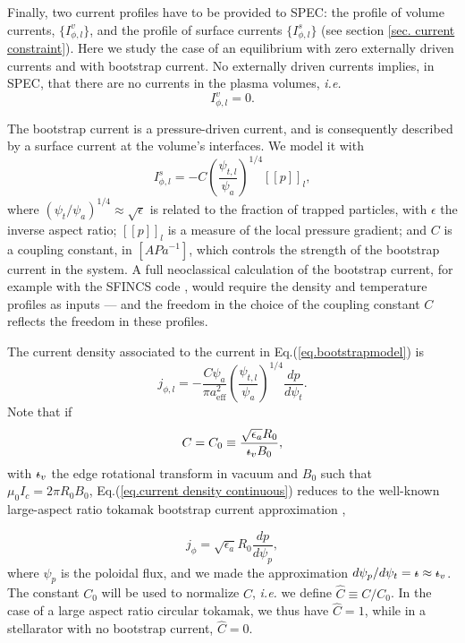 \documentclass[my_thesis.tex]{subfiles}
\begin{document}
Finally, two current profiles have to be provided to SPEC: the profile of volume currents, $\{I^v_{\phi,l}\}$, and the profile of surface currents $\{I^s_{\phi,l}\}$ (see section \ref{sec. current constraint}). Here we study the case of an equilibrium with zero externally driven currents and with bootstrap current. No externally driven currents implies, in SPEC, that there are no currents in the plasma volumes, \textit{i.e.}
\begin{equation}
	I^v_{\phi,l} = 0.\label{eq.volume current}
\end{equation}
	
The bootstrap current is a pressure-driven current, and is consequently described by a surface current at the volume's interfaces. We model it with
\begin{equation}
	I^s_{\phi,l} = -C \left(\frac{\psi_{t,l}}{\psi_a}\right)^{1/4} \left[\left[p\right]\right]_l, \label{eq.bootstrapmodel}
\end{equation}
where $(\psi_t / \psi_a)^{1/4}\approx\sqrt{\epsilon}$ is related to the fraction of trapped particles, with $\epsilon$ the inverse aspect ratio; $[[p]]_l$ is a measure of the local pressure gradient; and $C$ is a coupling constant, in $[APa^{-1}]$, which controls the strength of the bootstrap current in the system. 
A full neoclassical calculation of the bootstrap current, for example with the SFINCS code \citep{landremanComparisonParticleTrajectories2014}, would require the density and temperature profiles as inputs --- and the freedom in the choice of the coupling constant $C$ reflects the freedom in these profiles. 

	

The current density associated to the current in Eq.(\ref{eq.bootstrapmodel}) is
\begin{equation}
	j_{\phi,l} = -\frac{C\psi_a}{\pi a_{\text{eff}}^2}\left(\frac{\psi_{t,l}}{\psi_a}\right)^{1/4}\frac{dp}{d\psi_t}. \label{eq.current density continuous}
\end{equation}	
Note that if 
\begin{equation}
	C = C_0 \equiv \frac{\sqrt{\epsilon_a}R_0}{\text{$\iota\!\!$-}_v B_0}, \label{eq. def C0}
\end{equation}
with $\text{$\iota\!\!$-}_v$ the edge rotational transform in vacuum and $B_0$ such that $\mu_0I_c= 2\pi R_0 B_0$, Eq.(\ref{eq.current density continuous}) reduces to the well-known large-aspect ratio tokamak bootstrap current approximation \citep{helanderCollisionalTransportMagnetized2002},
	
\begin{equation}
	j_{\phi} = \sqrt{\epsilon_a}R_0\frac{d p}{d\psi_p},
\end{equation}
where $\psi_p$ is the poloidal flux, and we made the approximation $d\psi_p/d\psi_t=\text{$\iota\!\!$-}\approx\text{$\iota\!\!$-}_v$. The constant $C_0$ will be used to normalize $C$, \textit{i.e.} we define $\hat{C}\equiv C / C_0$. In the case of a large aspect ratio circular tokamak, we thus have $\hat C = 1$, while in a stellarator with no bootstrap current, $\hat C=0$.
	
\end{document}

